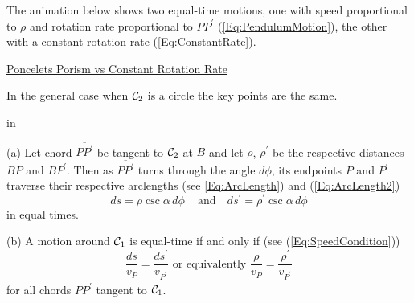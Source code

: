 \documentclass{ximera}
\newcommand{\pskip}{\vskip 0.1 in}
\begin{document}
\begin{exploration}
The animation below shows two equal-time motions, one with speed proportional to $\rho$ and rotation rate proportional to $PP^\prime$ (\ref{Eq:PendulumMotion}), the other with a constant rotation rate (\ref{Eq:ConstantRate}). 
\begin{onlineOnly}
    \begin{center}
\end{center}
\end{onlineOnly}

\href{https://www.desmos.com/calculator/xifdeg3wsq}{Poncelets Porism vs Constant Rotation Rate}

\end{exploration}







In the general case when ${\cal C}_2$ is a circle the key points are the same. %

\pskip

(a) Let chord $\overline{PP^\prime}$ be tangent to ${\cal C}_2$ at $B$ and let $\rho$, $\rho^\prime$ be the respective distances $BP$ and $BP^\prime$. Then as $\overline{PP^\prime}$ turns through the angle $d\phi$, its endpoints $P$ and $P^\prime$ traverse their respective arclengths (see \ref{Eq:ArcLength}) and (\ref{Eq:ArcLength2})
\[
     ds = \rho \csc \alpha \, d\phi \,\,\,\,\, \text{ and } \,\,\,\, ds^\prime = \rho^\prime \csc \alpha \, d\phi
\]  
in equal times.

(b) A motion around ${\cal C}_1$ is equal-time if and only if (see (\ref{Eq:SpeedCondition}))
\[
     \frac{ds}{v_P} = \frac{ds^\prime}{v_{P^\prime}}  \text{ or equivalently } \frac{\rho}{v_P} = \frac{\rho^\prime}{v_{P^\prime}} 
\] 
for all chords $\overline{PP^\prime}$ tangent to ${\cal C}_1$.
\end{document}
